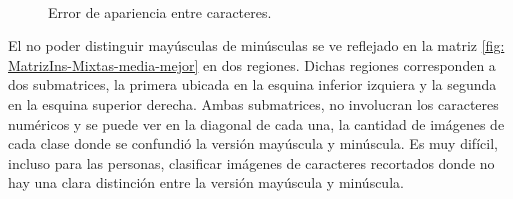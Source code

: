 		\begin{figure}[htbp]
			\centering
			\\
			\caption[Error de apariencia]{Error de apariencia entre caracteres.}
			\label{fig: Error-Apariencia}
		\end{figure}	
			
	
	El no poder distinguir mayúsculas de minúsculas se ve reflejado en la matriz \ref{fig: MatrizIns-Mixtas-media-mejor} en dos regiones. Dichas regiones corresponden a dos submatrices, la primera ubicada en la esquina inferior izquiera y la segunda en la esquina superior derecha. Ambas submatrices, no involucran los caracteres numéricos y se puede ver en la diagonal de cada una, la cantidad de imágenes de cada clase donde se confundió la versión mayúscula y minúscula. Es muy difícil, incluso para las personas, clasificar imágenes de caracteres recortados donde no hay una clara distinción entre la versión mayúscula y minúscula.
	
